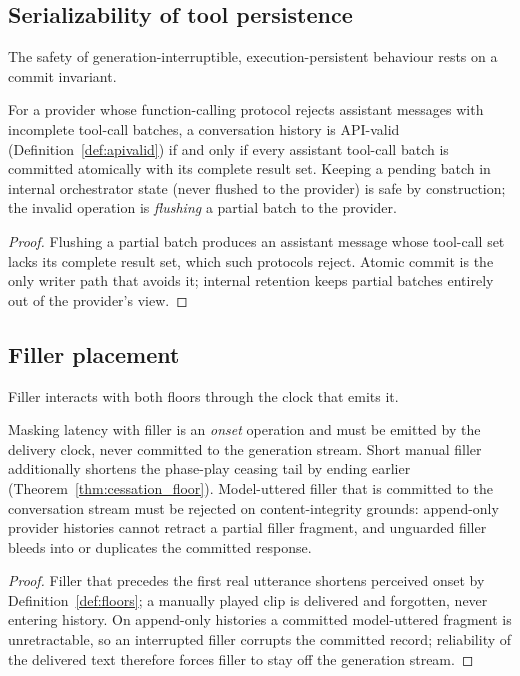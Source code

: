 \subsection{Serializability of tool persistence}
The safety of generation-interruptible, execution-persistent behaviour rests on a commit
invariant.

\begin{lemma}
\label{lem:serializability}
For a provider whose function-calling protocol rejects assistant messages with incomplete
tool-call batches, a conversation history is API-valid (Definition~\ref{def:apivalid}) if and
only if every assistant tool-call batch is committed atomically with its complete result set.
Keeping a pending batch in internal orchestrator state (never flushed to the provider) is
safe by construction; the invalid operation is \emph{flushing} a partial batch to the
provider.
\end{lemma}

\begin{proof}
Flushing a partial batch produces an assistant message whose tool-call set lacks its complete
result set, which such protocols reject.
Atomic commit is the only writer path that avoids it; internal retention keeps partial
batches entirely out of the provider's view.
\end{proof}

\subsection{Filler placement}
Filler interacts with both floors through the clock that emits it.

\begin{corollary}
\label{cor:filler}
Masking latency with filler is an \emph{onset} operation and must be emitted by the delivery
clock, never committed to the generation stream.
Short manual filler additionally shortens the phase-play ceasing tail by ending earlier
(Theorem~\ref{thm:cessation_floor}).
Model-uttered filler that is committed to the conversation stream must be rejected on
content-integrity grounds: append-only provider histories cannot retract a partial filler
fragment, and unguarded filler bleeds into or duplicates the committed response.
\end{corollary}

\begin{proof}
Filler that precedes the first real utterance shortens perceived onset by
Definition~\ref{def:floors}; a manually played clip is delivered and forgotten, never
entering history.
On append-only histories a committed model-uttered fragment is unretractable, so an
interrupted filler corrupts the committed record; reliability of the delivered text therefore
forces filler to stay off the generation stream.
\end{proof}

